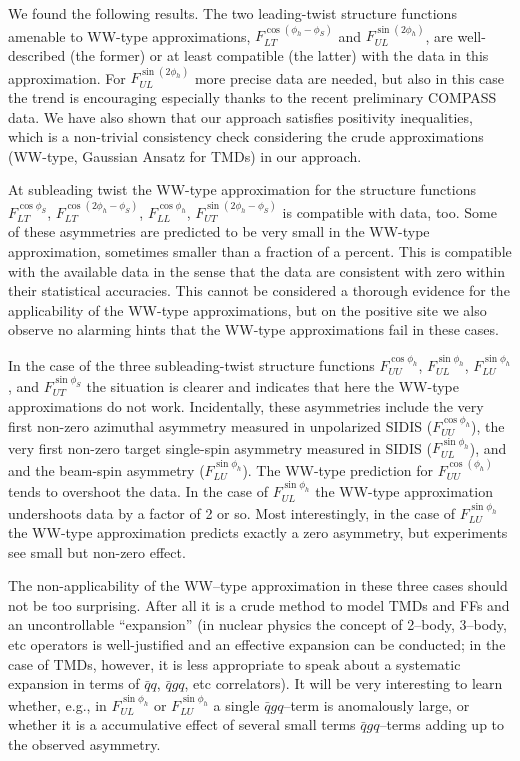 \documentclass[a4paper,11pt]{article}
\begin{document}
We found the following results. The two leading-twist
structure functions amenable to WW-type approximations,
	$F_{LT}^{\cos(\phi_h -\phi_S)}$ and
	$F_{UL}^{\sin(2\phi_h)}$,
are well-described (the former) or at least compatible
(the latter) with the data in this approximation. For
$F_{UL}^{\sin(2\phi_h)}$ more precise data are needed,
but also in this case the trend is encouraging
especially thanks to the recent preliminary COMPASS data.
We have also shown that our approach satisfies positivity
inequalities, which is a non-trivial consistency check
considering the crude approximations (WW-type, Gaussian
Ansatz for TMDs) in our approach.

At subleading twist the WW-type approximation for the
structure functions
	$F_{LT}^{\cos\phi_S}$,
	$F_{LT}^{\cos(2\phi_h-\phi_S)}$,
	$F_{LL}^{\cos\phi_h}$,
	$F_{UT}^{\sin(2\phi_h-\phi_S)}$
is compatible with data, too. Some of these asymmetries are
predicted to be very small in the WW-type approximation,
sometimes smaller than a fraction of a percent. This is
compatible with the available data in the sense that the
data are consistent with zero within their statistical
accuracies. This cannot be considered a thorough evidence
for the applicability of the WW-type approximations, but
on the positive site we also observe no alarming hints
that the WW-type approximations fail in these cases.

In the case of the three subleading-twist structure functions
	$F_{UU}^{\cos\phi_h}$,
	$F_{UL}^{\sin\phi_h}$,
	$F_{LU}^{\sin\phi_h}$, and
	$F_{UT}^{\sin\phi_S}$
the situation is clearer and indicates that here the WW-type
approximations do not work.
Incidentally, these asymmetries include the very first non-zero azimuthal
asymmetry measured in unpolarized SIDIS ($F_{UU}^{\cos\phi_h}$),
the very first non-zero target single-spin asymmetry measured in SIDIS
($F_{UL}^{\sin\phi_h}$), and {and the beam-spin asymmetry} ($F_{LU}^{\sin\phi_h}$).
The WW-type prediction for $F_{UU}^{\cos(\phi_h)}$ tends to overshoot
the data. In the case of $F_{UL}^{\sin\phi_h}$ the WW-type approximation
undershoots data by a factor of 2 or so.
Most interestingly, in the case of $F_{LU}^{\sin\phi_h}$ the WW-type
approximation predicts exactly a zero asymmetry, but experiments
see small but non-zero effect.

The non-applicability of the WW--type approximation in these three
cases should not be too surprising. After all it is a crude method
to model TMDs and FFs and an uncontrollable ``expansion''
(in nuclear physics the concept of 2--body, 3--body, etc operators
is well-justified and an effective expansion can be conducted; in
the case of TMDs, however, it is less appropriate to speak about a
systematic expansion in terms of $\bar{q}q$, $\bar{q}gq$, etc
correlators). It will be very interesting to learn whether, e.g.,
in $F_{UL}^{\sin\phi_h}$ or $F_{LU}^{\sin\phi_h}$ a single $\bar{q}gq$--term
is anomalously large, or whether it is a accumulative effect of
several small terms $\bar{q}gq$--terms adding up to the observed asymmetry.
\end{document}

